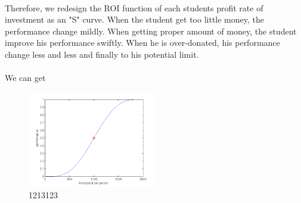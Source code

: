 \documentclass[11pt]{article}
\begin{document}
\paragraph{} Therefore, we redesign the ROI function of each students profit rate of investment as an "S" curve. When the student get too little money, the performance change mildly. When getting proper amount of money, the student improve his performance swiftly. When he is over-donated, his performance change less and less and finally to his potential limit.
\paragraph{} We can get    

\begin{figure}[H]
\centering
\includegraphics[width=0.5\textwidth]{sfun.png}
\caption{1213123}
\label{arch}
\end{figure}
\end{document}
